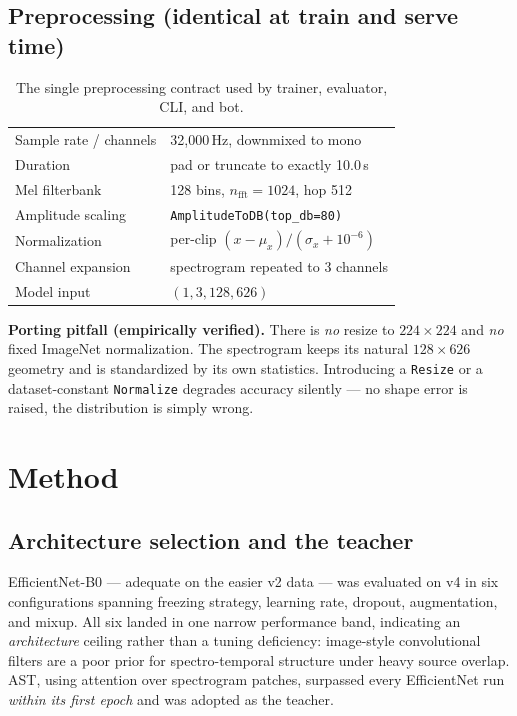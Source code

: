 \documentclass[11pt,a4paper]{article}
\begin{document}
\subsection{Preprocessing (identical at train and serve time)}\label{sec:preproc}

\begin{table}[h]
\centering\small
\begin{tabular}{@{}ll@{}}
\toprule
Sample rate / channels & 32{,}000\,Hz, downmixed to mono \\
Duration               & pad or truncate to exactly 10.0\,s \\
Mel filterbank         & 128 bins, $n_{\text{fft}}{=}1024$, hop 512 \\
Amplitude scaling      & \texttt{AmplitudeToDB(top\_db=80)} \\
Normalization          & per-clip $(x-\mu_x)/(\sigma_x + 10^{-6})$ \\
Channel expansion      & spectrogram repeated to 3 channels \\
Model input            & $(1, 3, 128, 626)$ \\
\bottomrule
\end{tabular}
\caption{The single preprocessing contract used by trainer, evaluator, CLI,
and bot.}
\label{tab:preproc}
\end{table}

\noindent\textbf{Porting pitfall (empirically verified).} There is
\emph{no} resize to $224{\times}224$ and \emph{no} fixed ImageNet
normalization. The spectrogram keeps its natural $128{\times}626$ geometry and
is standardized by its own statistics. Introducing a \texttt{Resize} or a
dataset-constant \texttt{Normalize} degrades accuracy silently --- no shape
error is raised, the distribution is simply wrong.

\section{Method}\label{sec:method}

\subsection{Architecture selection and the teacher}\label{sec:teacher}

EfficientNet-B0 --- adequate on the easier v2 data --- was evaluated on v4 in
six configurations spanning freezing strategy, learning rate, dropout,
augmentation, and mixup. All six landed in one narrow performance band,
indicating an \emph{architecture} ceiling rather than a tuning deficiency:
image-style convolutional filters are a poor prior for spectro-temporal
structure under heavy source overlap. AST, using attention over spectrogram
patches, surpassed every EfficientNet run \emph{within its first epoch} and
was adopted as the teacher.
\end{document}
